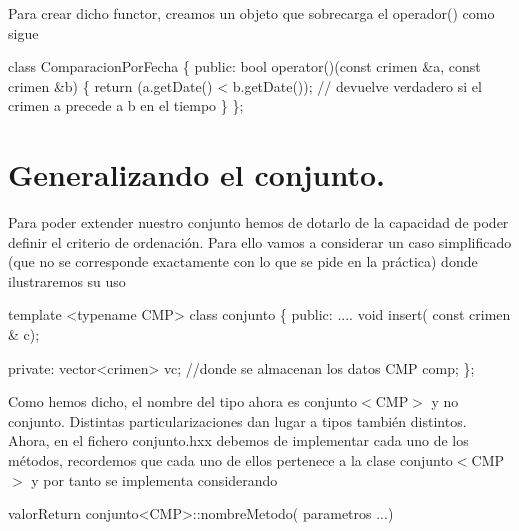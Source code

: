 Para crear dicho functor, creamos un objeto que sobrecarga el operador() como sigue


\begin{DoxyCode}
\textcolor{keyword}{class }ComparacionPorFecha \{
 \textcolor{keyword}{public}:
   \textcolor{keywordtype}{bool} operator()(\textcolor{keyword}{const} crimen &a, \textcolor{keyword}{const} crimen &b) \{
     \textcolor{keywordflow}{return} (a.getDate() < b.getDate()); \textcolor{comment}{// devuelve verdadero si el crimen a precede a b en el tiempo}
 \}
\};
\end{DoxyCode}
\hypertarget{index_generalizar}{}\section{Generalizando el conjunto.}\label{index_generalizar}
Para poder extender nuestro conjunto hemos de dotarlo de la capacidad de poder definir el criterio de ordenación. Para ello vamos a considerar un caso simplificado (que no se corresponde exactamente con lo que se pide en la práctica) donde ilustraremos su uso


\begin{DoxyCode}
\textcolor{keyword}{template} <\textcolor{keyword}{typename} CMP>
\textcolor{keyword}{class }conjunto \{
  \textcolor{keyword}{public}:
    ....
    \textcolor{keywordtype}{void} insert( \textcolor{keyword}{const} crimen & c);

  \textcolor{keyword}{private}:
    vector<crimen> vc; \textcolor{comment}{//donde se almacenan los datos}
    CMP comp;
\};
\end{DoxyCode}
 Como hemos dicho, el nombre del tipo ahora es conjunto$<$\+C\+M\+P$>$ y no conjunto. Distintas particularizaciones dan lugar a tipos también distintos. Ahora, en el fichero conjunto.\+hxx debemos de implementar cada uno de los métodos, recordemos que cada uno de ellos pertenece a la clase conjunto$<$\+C\+M\+P$>$ y por tanto se implementa considerando 
\begin{DoxyCode}
valorReturn conjunto<CMP>::nombreMetodo( parametros ...)
\end{DoxyCode}


